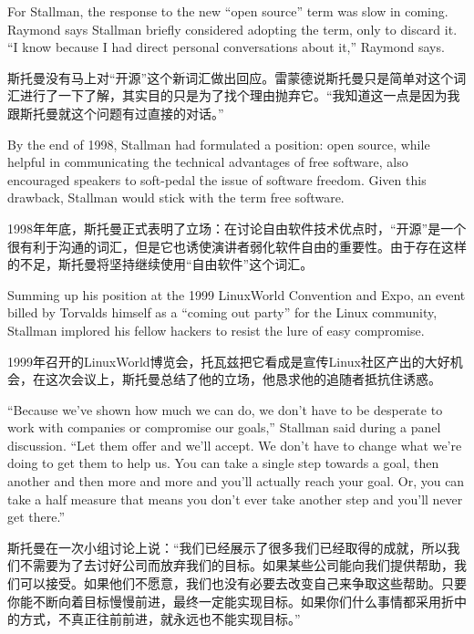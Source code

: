 \ifdefined\eng
For Stallman, the response to the new ``open source'' term was slow in coming. Raymond says Stallman briefly considered adopting the term, only to discard it. ``I know because I had direct personal conversations about it,'' Raymond says.
\fi

\ifdefined\chs
斯托曼没有马上对``开源''这个新词汇做出回应。雷蒙德说斯托曼只是简单对这个词汇进行了一下了解，其实目的只是为了找个理由抛弃它。``我知道这一点是因为我跟斯托曼就这个问题有过直接的对话。''
\fi

\ifdefined\eng
By the end of 1998, Stallman had formulated a position: open source, while helpful in communicating the technical advantages of free software, also encouraged speakers to soft-pedal the issue of software freedom. Given this drawback, Stallman would stick with the term free software.
\fi

\ifdefined\chs
1998年年底，斯托曼正式表明了立场：在讨论自由软件技术优点时，``开源''是一个很有利于沟通的词汇，但是它也诱使演讲者弱化软件自由的重要性。由于存在这样的不足，斯托曼将坚持继续使用``自由软件''这个词汇。
\fi

\ifdefined\eng
Summing up his position at the 1999 LinuxWorld Convention and Expo, an event billed by Torvalds himself as a ``coming out party'' for the Linux community, Stallman implored his fellow hackers to resist the lure of easy compromise.
\fi

\ifdefined\chs
1999年召开的LinuxWorld博览会，托瓦兹把它看成是宣传Linux社区产出的大好机会，在这次会议上，斯托曼总结了他的立场，他恳求他的追随者抵抗住诱惑。
\fi

\ifdefined\eng
``Because we've shown how much we can do, we don't have to be desperate to work with companies or compromise our goals,'' Stallman said during a panel discussion. ``Let them offer and we'll accept. We don't have to change what we're doing to get them to help us. You can take a single step towards a goal, then another and then more and more and you'll actually reach your goal. Or, you can take a half measure that means you don't ever take another step and you'll never get there.''
\fi

\ifdefined\chs
斯托曼在一次小组讨论上说：``我们已经展示了很多我们已经取得的成就，所以我们不需要为了去讨好公司而放弃我们的目标。如果某些公司能向我们提供帮助，我们可以接受。如果他们不愿意，我们也没有必要去改变自己来争取这些帮助。只要你能不断向着目标慢慢前进，最终一定能实现目标。如果你们什么事情都采用折中的方式，不真正往前前进，就永远也不能实现目标。''
\fi

